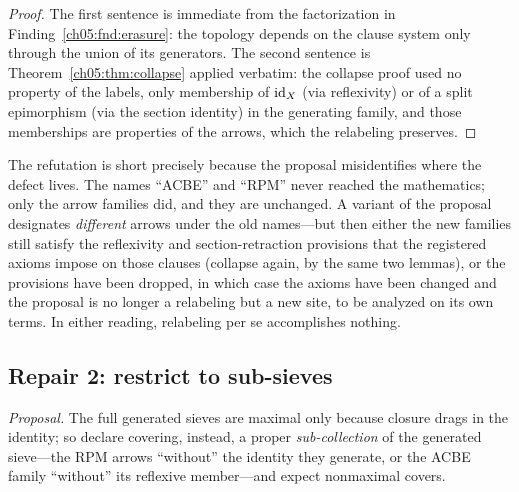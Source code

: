 \begin{proof}
The first sentence is immediate from the factorization in
Finding~\ref{ch05:fnd:erasure}: the topology depends on the clause system
only through the union of its generators. The second sentence is
Theorem~\ref{ch05:thm:collapse} applied verbatim: the collapse proof used no
property of the labels, only membership of $\mathrm{id}_X$ (via reflexivity) or of a
split epimorphism (via the section identity) in the generating family, and
those memberships are properties of the arrows, which the relabeling
preserves.
\end{proof}

\begin{remark}\label{ch05:rem:repair1}
The refutation is short precisely because the proposal misidentifies where
the defect lives. The names ``ACBE'' and ``RPM'' never reached the
mathematics; only the arrow families did, and they are unchanged. A variant
of the proposal designates \emph{different} arrows under the old names---but
then either the new families still satisfy the reflexivity and
section-retraction provisions that the registered axioms impose on those
clauses (collapse again, by the same two lemmas), or the provisions have
been dropped, in which case the axioms have been changed and the proposal is
no longer a relabeling but a new site, to be analyzed on its own terms. In
either reading, relabeling per se accomplishes nothing.
\end{remark}

\subsection{Repair 2: restrict to sub-sieves}\label{ch05:sub:repair2}

\emph{Proposal.} The full generated sieves are maximal only because closure
drags in the identity; so declare covering, instead, a proper
\emph{sub-collection} of the generated sieve---the RPM arrows ``without''
the identity they generate, or the ACBE family ``without'' its reflexive
member---and expect nonmaximal covers.

